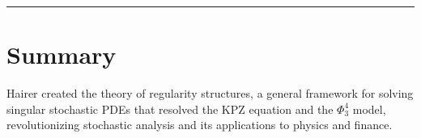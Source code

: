 \begin{center}\rule{0.5\linewidth}{0.5pt}\end{center}

\section*{Summary}

Hairer created the theory of regularity structures, a general framework for solving singular stochastic PDEs that resolved the KPZ equation and the $\Phi^4_3$ model, revolutionizing stochastic analysis and its applications to physics and finance.
